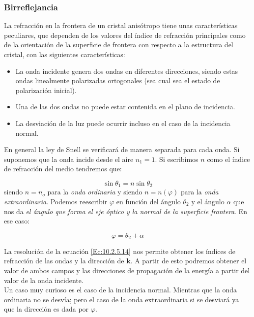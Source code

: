 \documentclass[12pt]{article}
\newcommand{\kn}{\mathbf{k}}
\numberwithin{equation}{section}
\numberwithin{figure}{section}
\begin{document}
\subsubsection{Birreflejancia}


La refracción en la frontera de un cristal anisótropo tiene unas características peculiares, que dependen de los valores del índice de refracción principales como de la orientación de la superficie de frontera con respecto a la estructura del cristal, con las siguientes características:

\begin{itemize}
\item La onda incidente genera dos ondas en diferentes direcciones, siendo estas ondas linealmente polarizadas ortogonales (sea cual sea el estado de polarización inicial).

\item Una de las dos ondas no puede estar contenida en el plano de incidencia.
\item La desviación de la luz puede ocurrir incluso en el caso de la incidencia normal.
\end{itemize}

En general la ley de Snell se verificará de manera separada para cada onda. Si suponemos que la onda incide desde el aire $n_1=1$. Si escribimos $n$ como el índice de refracción del medio tendremos que:

\begin{equation}
\sin \theta_1 = n \sin \theta_2 \label{Ec:10.2.5.14}
\end{equation}
siendo $n=n_o$ para la \textit{onda ordinaria} y siendo $n=n(\varphi)$ para la \textit{onda extraordinaria}. Podemos reescribir $\varphi$ en función del ángulo $\theta_2$ y el ángulo $\alpha$ que nos da \textit{el ángulo que forma el eje óptico y la normal de la superficie frontera}. En ese caso:

\begin{equation}
\varphi = \theta_2 + \alpha
\end{equation}

La resolución de la ecuación \ref{Ec:10.2.5.14} nos permite obtener los índices de refracción de las ondas y la dirección de $\kn$. A partir de esto podremos obtener el valor de ambos campos y las direcciones de propagación de la energía a partir del valor de la onda incidente. \\

Un caso muy curioso es el caso de la incidencia normal. Mientras que la onda ordinaria no se desvía; pero el caso de la onda extraordinaria si se desviará ya que la dirección es dada por $\varphi$. 
\end{document}
